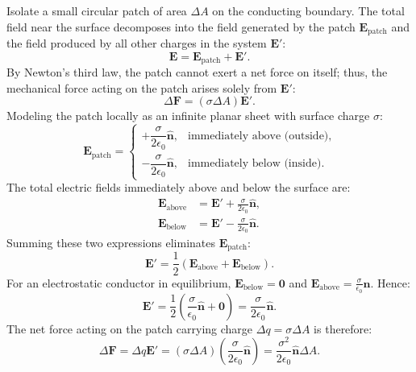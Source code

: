 \begin{proofbox}
Isolate a small circular patch of area \(\Delta A\) on the conducting boundary. The total field near the surface decomposes into the field generated by the patch \(\bm{E}_{\text{patch}}\) and the field produced by all other charges in the system \(\bm{E}'\):
\begin{equation}
    \bm{E} = \bm{E}_{\text{patch}} + \bm{E}'.
\end{equation}
By Newton's third law, the patch cannot exert a net force on itself; thus, the mechanical force acting on the patch arises solely from \(\bm{E}'\):
\begin{equation}
    \Delta\bm{F} = (\sigma \Delta A)\bm{E}'.
\end{equation}
Modeling the patch locally as an infinite planar sheet with surface charge \(\sigma\):
\begin{equation}
    \bm{E}_{\text{patch}} = \begin{cases}
        +\dfrac{\sigma}{2\epsilon_0}\hat{\bm{n}}, & \text{immediately above (outside)}, \\[1em]
        -\dfrac{\sigma}{2\epsilon_0}\hat{\bm{n}}, & \text{immediately below (inside)}.
    \end{cases}
\end{equation}
The total electric fields immediately above and below the surface are:
\begin{align}
    \bm{E}_{\text{above}} &= \bm{E}' + \frac{\sigma}{2\epsilon_0}\hat{\bm{n}}, \\
    \bm{E}_{\text{below}} &= \bm{E}' - \frac{\sigma}{2\epsilon_0}\hat{\bm{n}}.
\end{align}
Summing these two expressions eliminates \(\bm{E}_{\text{patch}}\):
\begin{equation}
    \bm{E}' = \frac{1}{2}\left(\bm{E}_{\text{above}} + \bm{E}_{\text{below}}\right).
\end{equation}
For an electrostatic conductor in equilibrium, \(\bm{E}_{\text{below}} = \bm{0}\) and \(\bm{E}_{\text{above}} = \frac{\sigma}{\epsilon_0}\hat{\bm{n}}\). Hence:
\begin{equation}
    \bm{E}' = \frac{1}{2}\left(\frac{\sigma}{\epsilon_0}\hat{\bm{n}} + \bm{0}\right) = \frac{\sigma}{2\epsilon_0}\hat{\bm{n}}.
\end{equation}
The net force acting on the patch carrying charge \(\Delta q = \sigma \Delta A\) is therefore:
\begin{equation}
    \Delta\bm{F} = \Delta q \bm{E}' = (\sigma \Delta A)\left(\frac{\sigma}{2\epsilon_0}\hat{\bm{n}}\right) = \frac{\sigma^2}{2\epsilon_0}\hat{\bm{n}}\Delta A.
\end{equation}
\end{proofbox}

